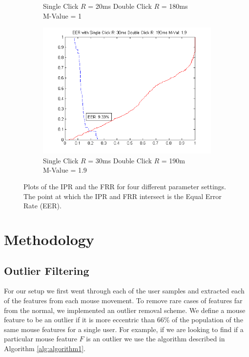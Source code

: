\documentclass[conference]{IEEEtran}
\begin{document}
\begin{figure}
\begin{subfigure}{.5\textwidth}
  \caption{Single Click $R$ = 20ms Double Click $R$ = 180ms\\M-Value = 1}
  \label{fig:sfig3}
\end{subfigure}%
\begin{subfigure}{.5\textwidth}
  \centering
  \includegraphics[width=.8\linewidth]{19M}
  \caption{Single Click $R$ = 30ms Double Click $R$ = 190m\\ M-Value = 1.9}
  \label{fig:sfig4}
\end{subfigure}
\caption{Plots of the IPR and the FRR for four different parameter settings. The point at which the IPR and FRR intersect is the Equal Error Rate (EER). }
\label{fig:fig}
\end{figure}



\section{Methodology}


\subsection{Outlier Filtering}

For our setup we first went through each of the user samples and extracted each of the features from each mouse movement. To remove rare cases of features far from the normal, we implemented an outlier removal scheme. We define a mouse feature to be an outlier if it is more eccentric than 66\% of the population of the same mouse features for a single user. For example, if we are looking to find if a particular mouse feature $F$ is an outlier we use the algorithm described in Algorithm \ref{alg:algorithm1}. 
\end{document}
